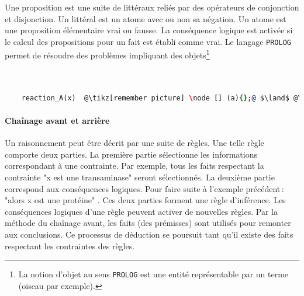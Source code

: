 \begin{refsegment}
    Une proposition est une suite de littéraux reliés par des opérateurs de conjonction et disjonction. Un littéral est un atome avec ou non sa négation. Un atome est une proposition élémentaire vrai ou fausse. La conséquence logique est activée si le calcul des propositions pour un fait est établi comme vrai. Le langage \texttt{PROLOG} \cite{colmerauer1990introduction,clocksin2003programming} permet de résoudre des problèmes impliquant des objets\footnote{La notion d'objet au sens \texttt{PROLOG} est une entité représentable par un terme (oiseau par exemple). }
    
    \begin{lstlisting}[basicstyle=\small\normalfont\ttfamily,mathescape,escapechar=@,language=Prolog, caption=représentation d'une proposition]
    
    
    reaction_A(x)  @\tikz[remember picture] \node [] (a){};@ $\land$ @\tikz[remember picture] \node [] (b){};@  $\lnot$reaction_B(y) @\tikz[remember picture] \node [] (c){};@
    \end{lstlisting}
    
    \paragraph{Chaînage avant et arrière} %
    Un raisonnement peut être décrit par une suite de règles. Une telle règle comporte deux parties. La première partie sélectionne les informations correspondant à une contrainte. Par exemple, tous les faits respectant la contrainte "x est une transaminase" seront sélectionnés. La deuxième partie correspond aux conséquences logiques. Pour faire suite à l'exemple précédent : "alors x est une protéine" . Ces deux parties forment une règle d'inférence. Les conséquences logiques d'une règle peuvent activer de nouvelles règles. Par la méthode du chaînage avant, les faits (des prémisses) sont utilisés pour remonter aux conclusions. Ce processus de déduction se poursuit tant qu'il existe des faits respectant les contraintes des règles.
    

\end{refsegment}
